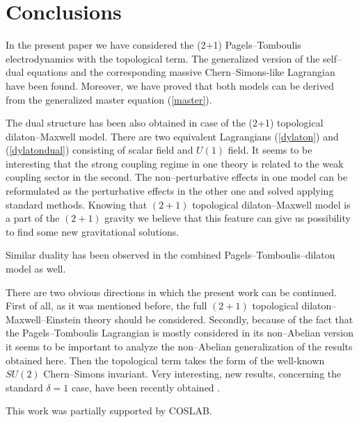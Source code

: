 \documentclass[a4 paper, 12 pt] {article}
\begin{document}
\section{\bf{Conclusions}}
In the present paper we have considered the (2+1) Pagels--Tomboulis
electrodynamics with the topological term. The generalized version
of the self--dual equations and the corresponding massive
Chern--Simons-like Lagrangian have been found. Moreover, we have
proved that both models can be derived from the generalized master
equation (\ref{master}).
\par
The dual structure has been also obtained in case of the (2+1)
topological dilaton--Maxwell model. There are two equivalent
Lagrangians (\ref{dylaton}) and (\ref{dylatondual}) consisting of
scalar field and $U(1)$ field. It seems to be interesting that the
strong coupling regime in one theory is related to the weak
coupling sector in the second. The non--perturbative effects in one
model can be reformulated as the perturbative effects in the other
one and solved applying standard methods. Knowing that $(2+1)$
topological dilaton--Maxwell model is a part of the $(2+1)$ gravity
we believe that this feature can give us possibility to find some
new gravitational solutions.
\par
Similar duality has been observed in the combined
Pagels--Tomboulis--dilaton model as well.
\par
There are two obvious directions in which the present work can be
continued. First of all, as it was mentioned before, the full
$(2+1)$ topological dilaton--Maxwell--Einstein theory should be
considered. Secondly, because of the fact that the
Pagels--Tomboulis Lagrangian is mostly considered in its
non--Abelian version it seems to be important to analyze the
non--Abelian generalization of the results obtained here. Then the
topological term takes the form of the well-known $SU(2)$
Chern--Simons invariant. Very interesting, new results, concerning
the standard $\delta =1$ case, have been recently obtained
\cite{wotzasek}.
\newline
\par
This work was partially supported by COSLAB.
\end{document}
